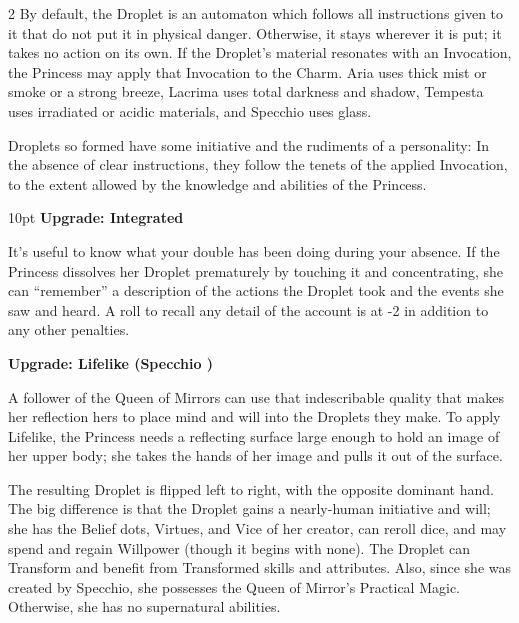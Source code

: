\begin{multicols}{2}
By default, the Droplet is an automaton which follows all instructions given to it that do not put it in physical danger. Otherwise, it stays wherever it is put; it takes no action on its own. If the Droplet's material resonates with an Invocation, the Princess may apply that Invocation to the Charm. Aria uses thick mist or smoke or a strong breeze, Lacrima uses total darkness and shadow, Tempesta uses irradiated or acidic materials, and Specchio uses glass. 

Droplets so formed have some initiative and the rudiments of a personality: In the absence of clear instructions, they follow the tenets of the applied Invocation, to the extent allowed by the knowledge and abilities of the Princess.

\begin{myindentpar}{10pt} \textbf{Upgrade: Integrated}

It's useful to know what your double has been doing during your absence. If the Princess dissolves her Droplet prematurely by touching it and concentrating, she can “remember” a description of the actions the Droplet took and the events she saw and heard. A roll to recall any detail of the account is at -2 in addition to any other penalties. 

\textbf{Upgrade: Lifelike (Specchio \textbullet\textbullet\textbullet)}

A follower of the Queen of Mirrors can use that indescribable quality that makes her reflection hers to place mind and will into the Droplets they make. To apply Lifelike, the Princess needs a reflecting surface large enough to hold an image of her upper body; she takes the hands of her image and pulls it out of the surface. 

The resulting Droplet is flipped left to right, with the opposite dominant hand. The big difference is that the Droplet gains a nearly-human initiative and will; she has the Belief dots, Virtues, and Vice of her creator, can reroll dice, and may spend and regain Willpower (though it begins with none). The Droplet can Transform and benefit from Transformed skills and attributes. Also, since she was created by Specchio, she possesses the Queen of Mirror's Practical Magic. Otherwise, she has no supernatural abilities. 


\end{myindentpar}
\end{multicols}
